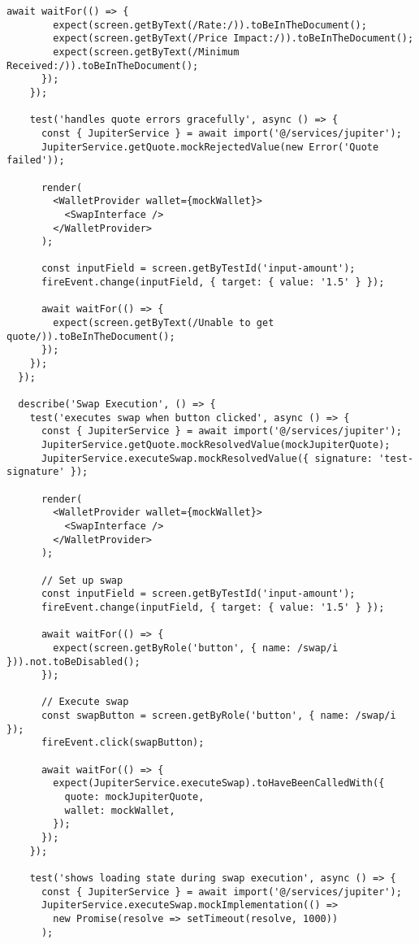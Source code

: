 \documentclass[11pt,a4paper]{article}
\begin{document}
\begin{lstlisting}[style=typescript, caption=React Component Unit Tests]
      await waitFor(() => {
        expect(screen.getByText(/Rate:/)).toBeInTheDocument();
        expect(screen.getByText(/Price Impact:/)).toBeInTheDocument();
        expect(screen.getByText(/Minimum Received:/)).toBeInTheDocument();
      });
    });

    test('handles quote errors gracefully', async () => {
      const { JupiterService } = await import('@/services/jupiter');
      JupiterService.getQuote.mockRejectedValue(new Error('Quote failed'));

      render(
        <WalletProvider wallet={mockWallet}>
          <SwapInterface />
        </WalletProvider>
      );

      const inputField = screen.getByTestId('input-amount');
      fireEvent.change(inputField, { target: { value: '1.5' } });

      await waitFor(() => {
        expect(screen.getByText(/Unable to get quote/)).toBeInTheDocument();
      });
    });
  });

  describe('Swap Execution', () => {
    test('executes swap when button clicked', async () => {
      const { JupiterService } = await import('@/services/jupiter');
      JupiterService.getQuote.mockResolvedValue(mockJupiterQuote);
      JupiterService.executeSwap.mockResolvedValue({ signature: 'test-signature' });

      render(
        <WalletProvider wallet={mockWallet}>
          <SwapInterface />
        </WalletProvider>
      );

      // Set up swap
      const inputField = screen.getByTestId('input-amount');
      fireEvent.change(inputField, { target: { value: '1.5' } });

      await waitFor(() => {
        expect(screen.getByRole('button', { name: /swap/i })).not.toBeDisabled();
      });

      // Execute swap
      const swapButton = screen.getByRole('button', { name: /swap/i });
      fireEvent.click(swapButton);

      await waitFor(() => {
        expect(JupiterService.executeSwap).toHaveBeenCalledWith({
          quote: mockJupiterQuote,
          wallet: mockWallet,
        });
      });
    });

    test('shows loading state during swap execution', async () => {
      const { JupiterService } = await import('@/services/jupiter');
      JupiterService.executeSwap.mockImplementation(() => 
        new Promise(resolve => setTimeout(resolve, 1000))
      );


\end{lstlisting}
\end{document}
